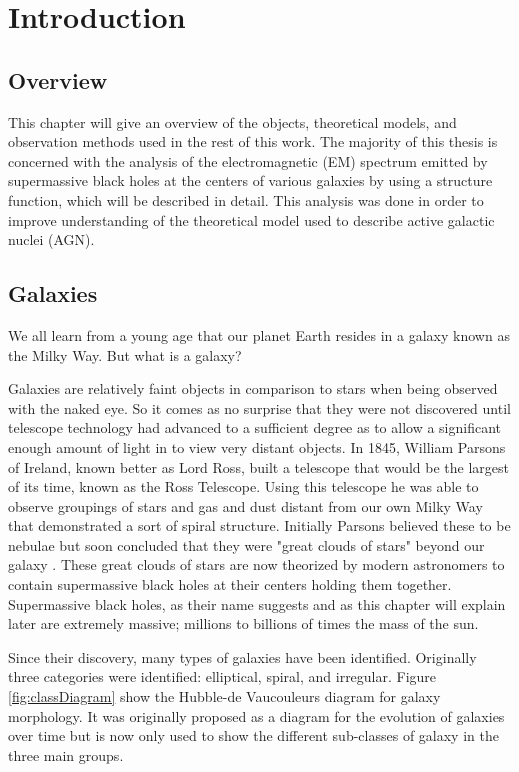\documentclass[12pt, oneside]{smuthesis}
\begin{document}
\chapter{\sc Introduction} \label{introduction}

\section{\sc Overview} \label{overview}

This chapter will give an overview of the objects, theoretical models, and observation methods used in the rest of this work. The majority of this thesis is concerned with the analysis of the electromagnetic (EM) spectrum emitted by supermassive black holes at the centers of various galaxies by using a structure function, which will be described in detail. This analysis was done in order to improve understanding of the theoretical model used to describe active galactic nuclei (AGN).

\section{\sc Galaxies} \label{galaxies}

We all learn from a young age that our planet Earth resides in a galaxy known as the Milky Way. But what is a galaxy?

Galaxies are relatively faint objects in comparison to stars when being observed with the naked eye. So it comes as no surprise that they were not discovered until telescope technology had advanced to a sufficient degree as to allow a significant enough amount of light in to view very distant objects. In 1845, William Parsons of Ireland, known better as Lord Ross, built a telescope that would be the largest of its time, known as the Ross Telescope. Using this telescope he was able to observe groupings of stars and gas and dust distant from our own Milky Way that demonstrated a sort of spiral structure. Initially Parsons believed these to be nebulae but soon concluded that they were "great clouds of stars" beyond our galaxy \citep{sag}. These great clouds of stars are now theorized by modern astronomers to contain supermassive black holes at their centers holding them together. Supermassive black holes, as their name suggests and as this chapter will explain later are extremely massive; millions to billions of times the mass of the sun.

Since their discovery, many types of galaxies have been identified. Originally three categories were identified: elliptical, spiral, and irregular. Figure \ref{fig:classDiagram} show the Hubble-de Vaucouleurs diagram for galaxy morphology. It was originally proposed as a diagram for the evolution of galaxies over time but is now only used to show the different sub-classes of galaxy in the three main groups.
\end{document}
